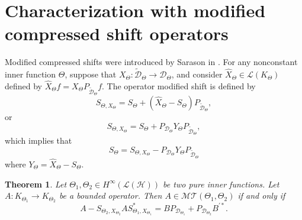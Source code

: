 \documentclass[11pt]{amsart}
\numberwithin{equation}{section}
\newcommand{\hsp}{\mathcal{H}}
\newcommand{\oL }{\mathcal{L}(\hsp) }
\newtheorem{theorem}{Theorem}[section]
\theoremstyle{definition}
\numberwithin{equation}{section}
\begin{document}
\section{Characterization with modified compressed shift operators}
  Modified compressed shifts were introduced by Sarason in \cite[section 10]{sar}. For any nonconstant inner function $\Theta$, suppose that $X_\Theta : \widetilde{\mathcal{D}}_{\Theta}\rightarrow \mathcal{D}_{\Theta}$, and consider $\widehat{X}_\Theta\in \mathcal{ L}(K_\Theta)$ defined by $\widehat{X}_\Theta f=X_\Theta P_{\widetilde{\mathcal{D}}_{\Theta}}f$.
The operator modified shift is  defined by
$$S_{\Theta, X_\Theta}=S_{\Theta}+(\widehat{X}_\Theta-S_{\Theta})P_{\widetilde{\mathcal{D}}_{\Theta}}, $$
or $$S_{\Theta, X_\Theta}=S_{\Theta}+P_{\mathcal{D}_{\Theta}}Y_{\Theta}P_{\widetilde{\mathcal{D}}_{\Theta}}, $$
which implies that $$S_{\Theta}=S_{\Theta, X_\Theta}-P_{\mathcal{D}_{\Theta}}Y_{\Theta}P_{\widetilde{\mathcal{D}}_{\Theta}}$$
where $Y_{\Theta}=\widehat{X}_{\Theta}-S_{\Theta}$.
\begin{theorem} Let $ {\Theta_1}, {\Theta_2}\in H^\infty (\oL)$ be two pure inner functions. Let $A:K_{\Theta_{1}}\rightarrow  K_{\Theta_{2}}$ be a bounded operator.
Then $A\in\mathcal{MT}(\Theta_{1}, \Theta_{2})$  if and only if
\begin{equation}
A-S_{\Theta_2, X_{\Theta_2}}AS_{\Theta_1, X_{\Theta_1}}^*=B P_{\mathcal{D}_{\Theta_1}}+P_{\mathcal{D}_{\Theta_2}}B^{'*}.
\end{equation}
\end{theorem}
\end{document}
